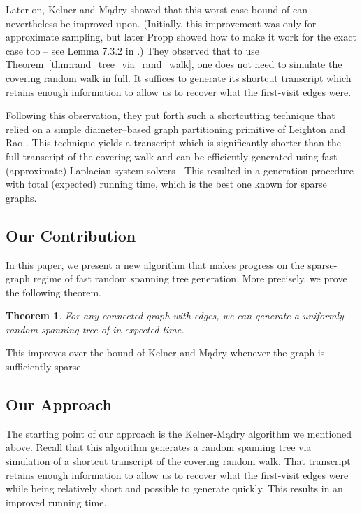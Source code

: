 \documentclass[11pt, letterpaper]{article}
\newtheorem{theorem}{Theorem}[section]
\begin{document}
Later on,  Kelner and Mądry \cite{KelnerM09} showed that this worst-case bound of  can nevertheless be improved upon. (Initially, this improvement was only for approximate sampling, but later Propp \cite{Propp10} showed how to make it work for the exact case too -- see Lemma 7.3.2 in \cite{Madry11}.) They observed that to use Theorem~\ref{thm:rand_tree_via_rand_walk}, one does not need to simulate the covering random walk in full. It suffices to generate its shortcut transcript which retains enough information to allow us to recover what the first-visit edges were. 

 Following this observation, they put forth such a shortcutting technique that relied on a simple diameter--based graph partitioning primitive of Leighton and Rao \cite{LeightonR99}. This technique yields a transcript which is significantly shorter than the full transcript of the covering walk and can be efficiently generated using fast (approximate) Laplacian system solvers \cite{SpielmanT03,SpielmanT04,KoutisMP10,KoutisMP11,KelnerOSZ13}.  This resulted in a generation procedure with  total (expected) running time, which is the best one known for sparse graphs.


\subsection{Our Contribution}

In this paper, we present a new algorithm that makes progress on the sparse-graph regime of fast random spanning tree generation. More precisely, we prove the following theorem. 

\begin{theorem}
\label{thm:main}
For any connected graph  with  edges, we can generate a uniformly random spanning tree of  in expected  time.
\end{theorem}
This improves over the  bound of Kelner and Mądry \cite{KelnerM09} whenever the graph is sufficiently sparse.

\subsection{Our Approach}\label{sec:our_approach}

The starting point of our approach is the Kelner-Mądry algorithm \cite{KelnerM09} we mentioned above. Recall that this algorithm generates a random spanning tree via simulation of a shortcut transcript of the covering random walk. That transcript retains enough information to allow us to recover what the first-visit edges were while being relatively short and possible to generate quickly. This results in an improved  running time. 
\end{document}
